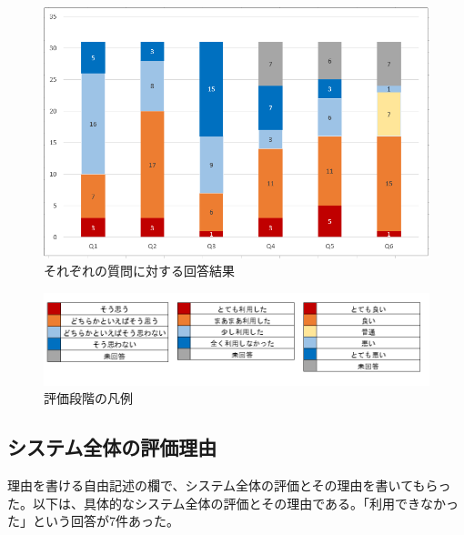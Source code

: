 \documentclass{risepaper}
\begin{document}
\begin{figure}[h]
\begin{center}
\includegraphics[scale=1.0]{img/flex_bar_graph.PNG}
\caption{それぞれの質問に対する回答結果}%
\label{fig:flex_bar_graph}
\end{center}%
\end{figure}%

\begin{figure}[h]
\begin{center}
\includegraphics[scale=1.0]{img/flex_usage_guide.PNG}
\caption{評価段階の凡例}%
\label{fing:flex_usage_guide}
\end{center}%
\end{figure}%

   		\subsection{システム全体の評価理由}

理由を書ける自由記述の欄で、システム全体の評価とその理由を書いてもらった。以下は、具体的なシステム全体の評価とその理由である。「利用できなかった」という回答が7件あった。
\end{document}
